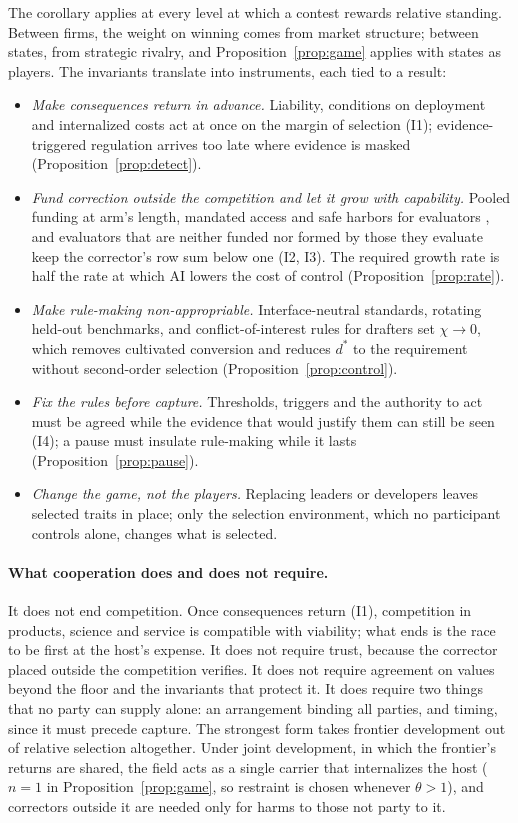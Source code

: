 \documentclass[letterpaper]{article} %
\theoremstyle{definition}
\begin{document}
The corollary applies at every level at which a contest rewards relative standing. Between firms, the weight on winning comes from market structure; between states, from strategic rivalry, and Proposition~\ref{prop:game} applies with states as players. The invariants translate into instruments, each tied to a result:
\begin{itemize}
\item \emph{Make consequences return in advance.} Liability, conditions on deployment and internalized costs act at once on the margin of selection (I1); evidence-triggered regulation arrives too late where evidence is masked (Proposition~\ref{prop:detect}).
\item \emph{Fund correction outside the competition and let it grow with capability.} Pooled funding at arm's length, mandated access and safe harbors for evaluators \citep{longpre2024}, and evaluators that are neither funded nor formed by those they evaluate keep the corrector's row sum below one (I2, I3). The required growth rate is half the rate at which AI lowers the cost of control (Proposition~\ref{prop:rate}).
\item \emph{Make rule-making non-appropriable.} Interface-neutral standards, rotating held-out benchmarks, and conflict-of-interest rules for drafters set $\chi\to0$, which removes cultivated conversion and reduces $d^\ast$ to the requirement without second-order selection (Proposition~\ref{prop:control}).
\item \emph{Fix the rules before capture.} Thresholds, triggers and the authority to act must be agreed while the evidence that would justify them can still be seen (I4); a pause must insulate rule-making while it lasts (Proposition~\ref{prop:pause}).
\item \emph{Change the game, not the players.} Replacing leaders or developers leaves selected traits in place; only the selection environment, which no participant controls alone, changes what is selected.
\end{itemize}

\paragraph{What cooperation does and does not require.} It does not end competition. Once consequences return (I1), competition in products, science and service is compatible with viability; what ends is the race to be first at the host's expense. It does not require trust, because the corrector placed outside the competition verifies. It does not require agreement on values beyond the floor and the invariants that protect it. It does require two things that no party can supply alone: an arrangement binding all parties, and timing, since it must precede capture. The strongest form takes frontier development out of relative selection altogether. Under joint development, in which the frontier's returns are shared, the field acts as a single carrier that internalizes the host ($n=1$ in Proposition~\ref{prop:game}, so restraint is chosen whenever $\theta>1$), and correctors outside it are needed only for harms to those not party to it.
\end{document}
